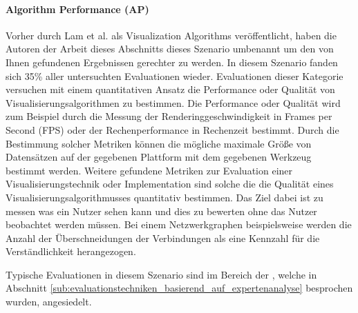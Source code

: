 \documentclass[draft=false
              ,paper=a4
              ,twoside=false
              ,fontsize=11pt
              ,headsepline
              ,BCOR10mm
              ,DIV11
              ]{scrbook}
\begin{document}
\paragraph{Algorithm Performance (AP)} %
\label{par:algorithm_performance_}
Vorher durch Lam et al. als Visualization Algorithms veröffentlicht, haben die Autoren der Arbeit dieses Abschnitts dieses Szenario umbenannt um den von Ihnen gefundenen Ergebnissen gerechter zu werden. In diesem Szenario fanden sich 35\% aller untersuchten Evaluationen wieder. Evaluationen dieser Kategorie versuchen mit einem quantitativen Ansatz die Performance oder Qualität von Visualisierungsalgorithmen zu bestimmen. Die Performance oder Qualität wird zum Beispiel durch die Messung der Renderinggeschwindigkeit in Frames per Second (FPS) oder der Rechenperformance in Rechenzeit bestimmt. Durch die Bestimmung solcher Metriken können die mögliche maximale Größe von Datensätzen auf der gegebenen Plattform mit dem gegebenen Werkzeug bestimmt werden. Weitere gefundene Metriken zur Evaluation einer Visualisierungstechnik oder Implementation sind solche die die Qualität eines Visualisierungsalgorithmusses quantitativ bestimmen. Das Ziel dabei ist zu messen was ein Nutzer sehen kann und dies zu bewerten ohne das Nutzer beobachtet werden müssen. Bei einem Netzwerkgraphen beispielsweise werden die Anzahl der Überschneidungen der Verbindungen als eine Kennzahl für die Verständlichkeit herangezogen. 

Typische Evaluationen in diesem Szenario sind im Bereich der , welche in Abschnitt \ref{sub:evaluationstechniken_basierend_auf_expertenanalyse} besprochen wurden, angesiedelt.
\end{document}
